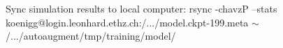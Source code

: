 \documentclass[10pt,twocolumn,letterpaper]{article}
\begin{document}
Sync simulation results to local computer: rsync -chavzP --stats koenigg@login.leonhard.ethz.ch:/.../model.ckpt-199.meta $\sim$/.../autoaugment/tmp/training/model/




{\small


}
\end{document}
